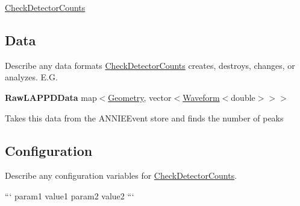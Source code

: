 \hyperlink{classCheckDetectorCounts}{Check\-Detector\-Counts}

\subsection*{Data}

Describe any data formats \hyperlink{classCheckDetectorCounts}{Check\-Detector\-Counts} creates, destroys, changes, or analyzes. E.\-G.

{\bfseries Raw\-L\-A\-P\-P\-D\-Data} {\ttfamily map$<$\hyperlink{classGeometry}{Geometry}, vector$<$\hyperlink{classWaveform}{Waveform}$<$double$>$$>$$>$}
\begin{DoxyItemize}
\item Takes this data from the {\ttfamily A\-N\-N\-I\-E\-Event} store and finds the number of peaks
\end{DoxyItemize}

\subsection*{Configuration}

Describe any configuration variables for \hyperlink{classCheckDetectorCounts}{Check\-Detector\-Counts}.

``` param1 value1 param2 value2 ``` 